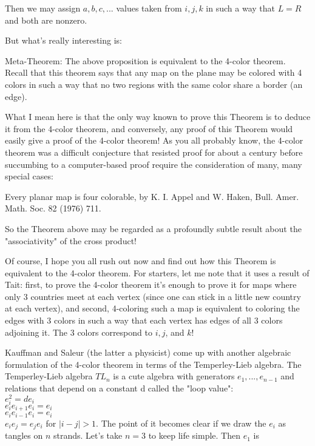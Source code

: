 Then we may assign $a,b,c,...$ values taken from ${i,j,k}$ in such a way that $L = R$ and both are nonzero.

But what's really interesting is:

Meta-Theorem: The above proposition is equivalent to the 4-color theorem. Recall that this theorem says that any map on the plane may be colored with 4 colors in such a way that no two regions with the same color share a border (an edge).

What I mean here is that the only way known to prove this Theorem is to deduce it from the 4-color theorem, and conversely, any proof of this Theorem would easily give a proof of the 4-color theorem! As you all probably know, the 4-color theorem was a difficult conjecture that resisted proof for about a century before succumbing to a computer-based proof require the consideration of many, many special cases:

Every planar map is four colorable, by K. I. Appel and W. Haken, Bull. Amer. Math. Soc. 82 (1976) 711.

So the Theorem above may be regarded as a profoundly subtle result about the "associativity" of the cross product!

Of course, I hope you all rush out now and find out how this Theorem is equivalent to the 4-color theorem. For starters, let me note that it uses a result of Tait: first, to prove the 4-color theorem it's enough to prove it for maps where only 3 countries meet at each vertex (since one can stick in a little new country at each vertex), and second, 4-coloring such a map is equivalent to coloring the edges with 3 colors in such a way that each vertex has edges of all 3 colors adjoining it. The 3 colors correspond to $i, j$, and $k$!

Kauffman and Saleur (the latter a physicist) come up with another algebraic formulation of the 4-color theorem in terms of the Temperley-Lieb algebra. The Temperley-Lieb algebra $TL_n$ is a cute algebra with generators $e_1, ..., e_{n-1}$ and relations that depend on a constant d called the "loop value":\\
$e_i^2 = de_i$\\
$e_i e_{i+1} e_i = e_i$\\
$e_i e_{i-1} e_i = e_i$\\
$e_i e_j = e_j e_i$     for $|i -j| > 1$.
The point of it becomes clear if we draw the $e_i$ as tangles on $n$ strands. Let's take $n=3$ to keep life simple. Then $e_1$ is\\

